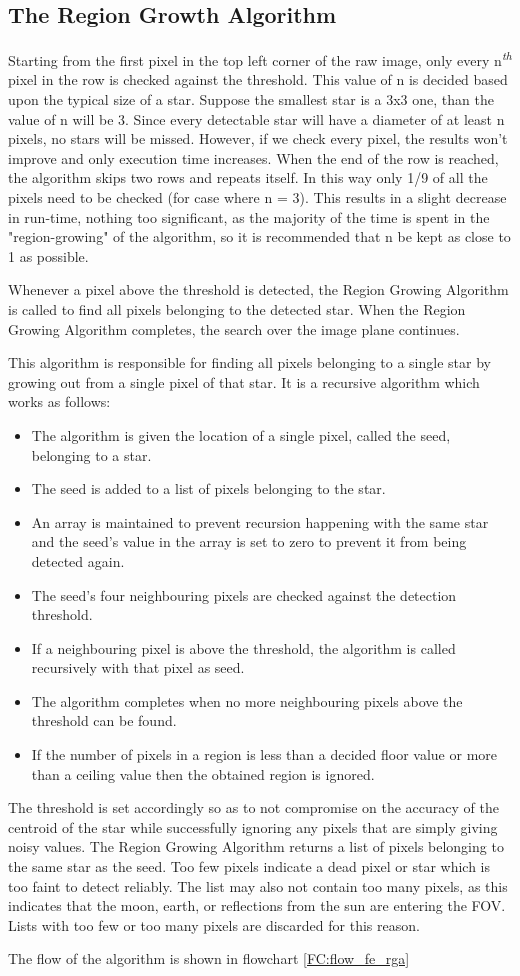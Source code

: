 \documentclass[../../main.tex]{subfiles}
\begin{document}
\subsection{The Region Growth Algorithm} \label{subsec:fe_region_growth}
Starting from the first pixel in the top left corner of the raw image, only every n\textsuperscript{\textit{th}} pixel in the row is checked against the threshold. This value of n is decided based upon the typical size of a star. Suppose the smallest star is a 3x3 one, than the value of n will be 3. Since every detectable star will have a diameter of at least n pixels, no stars will be missed. However, if we check every pixel, the results won't improve and only execution time increases. When the end of the row is reached, the algorithm skips two rows and repeats itself. In this way only 1/9 of all the pixels need to be checked (for case where n = 3). This results in a slight decrease in run-time, nothing too significant, as the majority of the time is spent in the "region-growing" of the algorithm, so it is recommended that n be kept as close to 1 as possible.

Whenever a pixel above the threshold is detected, the Region Growing Algorithm is called to find all pixels belonging to the detected star. When the Region Growing Algorithm completes, the search over the image plane continues.

This algorithm is responsible for finding all pixels belonging to a single star by growing out from a single pixel of that star. It is a recursive algorithm which works as follows:
\begin{itemize}
    \item The algorithm is given the location of a single pixel, called the seed, belonging to a star.
    \item The seed is added to a list of pixels belonging to the star.
    \item An array is maintained to prevent recursion happening with the same star and the seed's value in the array is set to zero to prevent it from being detected again.
    \item The seed's four neighbouring pixels are checked against the detection threshold.
    \item If a neighbouring pixel is above the threshold, the algorithm is called recursively with that pixel as seed.
    \item The algorithm completes when no more neighbouring pixels above the threshold can be found.
    \item If the number of pixels in a region is less than a decided floor value or more than a ceiling value then the obtained region is ignored.
\end{itemize}
The threshold is set accordingly so as to not compromise on the accuracy of the centroid of the star while successfully ignoring any pixels that are simply giving noisy values. The Region Growing Algorithm returns a list of pixels belonging to the same star as the seed. Too few pixels indicate a dead pixel or star which is too faint to detect reliably. The list may also not contain too many pixels, as this indicates that the moon, earth, or reflections from the sun are entering the FOV. Lists with too few or too many pixels are discarded for this reason.

The flow of the algorithm is shown in flowchart \ref{FC:flow_fe_rga}
\end{document}
